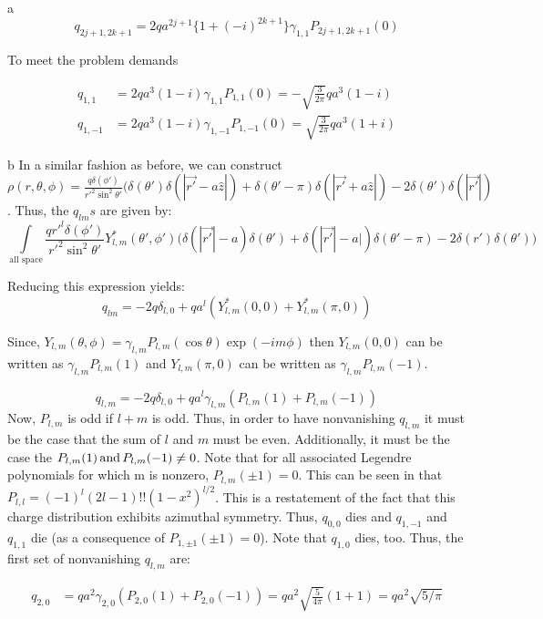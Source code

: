 \begin{homeworkProblem}
\begin{homeworkSection}{a}
\[
	q_{2j+1,2k+1} = 2q a^{2j+1} \big\{ 1+(-i)^{2k+1} \big\}\gamma_{1,1}P_{2j+1,2k+1}(0)
\]

To meet the problem demands
\begin{center}
	\begin{align*}
		q_{1,1} &= 2qa^3(1-i)\gamma_{1,1}P_{1,1}(0) = -\sqrt{\frac{3}{2\pi}}qa^3(1-i) \\
		q_{1,-1} &= 2qa^3(1-i)\gamma_{1,-1}P_{1,-1}(0) = \sqrt{\frac{3}{2\pi}}qa^3(1+i)
	\end{align*}
\end{center}

\end{homeworkSection}

\begin{homeworkSection}{b}
	In a similar fashion as before, we can construct $\rho(r,\theta,\phi) = \frac{q\delta(\phi')}{r'^2\sin^2\theta'}\big( \delta(\theta')\delta(|\vec{r'}-a\hat{z}|) + \delta(\theta'-\pi)\delta(|\vec{r'}+a\hat{z}|)- 2\delta(\theta')\delta(|\vec{r'}|)$. Thus, the $q_{lm}s$ are given by:
	\[
	\int\limits_{\text{all space}}\frac{qr'^l\delta(\phi')}{r'^2\sin^2\theta'} Y^*_{l,m}(\theta',\phi')\bigg(\delta(|\vec{r'}|-a)\delta(\theta')+\delta(|\vec{r'}|-a|)\delta(\theta'-\pi)-2\delta(r')\delta(\theta')\big)
	\]
	
	Reducing this expression yields:
	\[
	q_{lm} = -2q\delta_{l,0} + qa^l(Y^*_{l,m}(0,0)+Y^*_{l,m}(\pi,0))
	\]
	
	Since, $Y_{l,m}(\theta,\phi) = \gamma_{l,m}P_{l,m}(\cos\theta)\exp(-im\phi)$ then $Y_{l,m}(0,0)$ can be written as $\gamma_{l,m}P_{l,m}(1)$ and $Y_{l,m}(\pi,0)$ can be written as $\gamma_{l,m}P_{l,m}(-1)$.
	
	\[
	q_{l,m} = -2q\delta_{l,0}+qa^l\gamma_{l,m}(P_{l,m}(1)+P_{l,m}(-1))
	\]
	Now, $P_{l,m}$ is odd if $l+m$ is odd. Thus, in order to have nonvanishing $q_{l,m}$ it must be the case that the sum of $l$ and $m$ must be even. Additionally, it must be the case the $P_{l,m}(1) \text{\,and\,} P_{l,m}(-1) \ne 0$. Note that for all associated Legendre polynomials for which m is nonzero, $P_{l,m}(\pm 1) = 0$. This can be seen in that $P_{l,l} = (-1)^l(2l-1)!!(1-x^2)^{l/2}$. This is a restatement of the fact that this charge distribution exhibits azimuthal symmetry.  Thus, $q_{0,0}$ dies and \Leftrightarrow$q_{1,-1}$ and $q_{1,1}$ die (as a consequence of $P_{1,\pm 1}(\pm 1) = 0$). Note that $q_{1,0}$ dies, too. Thus, the first set of nonvanishing $q_{l,m}$ are:
\begin{center}
	\begin{align*}
	q_{2,0} &= qa^2\gamma_{2,0}(P_{2,0}(1) + P_{2,0}(-1)) = qa^2\sqrt{\frac{5}{4\pi}}(1+1) = qa^2\sqrt{5/\pi}
	\end{align*}
\end{center}
	
\end{homeworkSection}

\end{homeworkProblem}